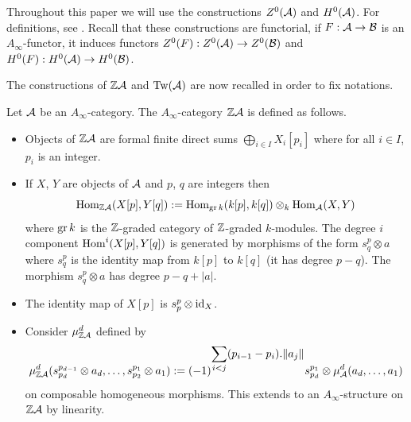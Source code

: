 \documentclass[12pt]{article}
\begin{document}
	Throughout this paper we will use the constructions $Z^0({\cal{A}})$ and $H^0({\cal{A}})$. For definitions, see \cite[Section 1a, Section 3k]{Sei}. Recall that these constructions are functorial, if $F: {\cal{A}} \to {\cal{B}}$ is an $A_\infty$-functor, it induces functors $Z^0(F): Z^0({\cal{A}}) \to Z^0({\cal{B}})$ and $H^0(F): H^0({\cal{A}}) \to H^0({\cal{B}})$.
	
	The constructions of $\mathbb{Z} {\cal{A}}$ and $\textup{Tw}({\cal{A}})$ are now recalled in order to fix notations.
	
	
	\begin{definition}
		Let ${\cal{A}}$ be an $A_\infty$-category. The $A_\infty$-category $\mathbb{Z} {\cal{A}}$ is defined as follows.
		\begin{itemize}
			\item Objects of $\mathbb{Z} {\cal{A}}$ are formal finite direct sums $\displaystyle\bigoplus_{i \in I} X_i[p_i]$ where for all $i \in I$, $p_i$ is an integer.
			\item If $X$, $Y$ are objects of ${\cal{A}}$ and $p$, $q$ are integers then 
			\[\textup{Hom}_{\mathbb{Z} {\cal{A}}}(X[p], Y[q]):= \textup{Hom}_{\textup{gr} \, k}(k[p],k[q]) \otimes_k \textup{Hom}_{\cal{A}}(X,Y)\]
			where $\textup{gr} \, k$ is the $\mathbb{Z}$-graded category of $\mathbb{Z}$-graded $k$-modules.
			The degree $i$ component $\textup{Hom}^i(X[p],Y[q])$ is generated by morphisms of the form $s^p_q \otimes a$ where $s^p_q$ is the identity map from $k[p]$ to $k[q]$ (it has degree $p-q$). The morphism $s^p_q \otimes a$ has degree $p-q + |a|$.
			\item The identity map of $X[p]$ is $s^p_p \otimes \textup{id}_X$.
			\item Consider $\mu^d_{\mathbb{Z} {\cal{A}}}$ defined by 
			\[\mu_{\mathbb{Z} {\cal{A}}}^d(s^{p_{d-1}}_{p_d} \otimes a_d, \dots, s^{p_1}_{p_2} \otimes a_1):= (-1)^{\displaystyle\sum_{i < j} (p_{i-1} -p_i).\|a_j\|} s^{p_1}_{p_d} \otimes \mu_{\cal{A}}^d(a_d,\dots, a_1)\]
			on composable homogeneous morphisms. This extends to an $A_\infty$-structure on $\mathbb{Z} {\cal{A}}$ by linearity.
		\end{itemize}
	\end{definition}
	
\end{document}
